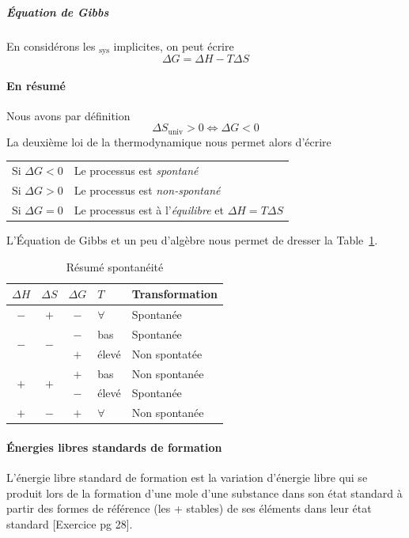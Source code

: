 \documentclass[11pt,a4paper,french]{article}
\begin{document}
\subparagraph{\'Equation de Gibbs} En considérons les $_\mathrm{sys}$ implicites, on peut écrire
$$\Delta G=\Delta H-T\Delta S$$

\paragraph{En résumé}
Nous avons par définition
\[ \Delta S_\mathrm{univ} > 0 \Leftrightarrow \Delta G < 0 \]
La deuxième loi de la thermodynamique nous permet alors d'écrire
\begin{center}
	\begin{tabular}{ll}
		Si $\Delta G < 0$ & Le processus est \emph{spontané}\\
		Si $\Delta G > 0$ & Le processus est \emph{non-spontané}\\
		Si $\Delta G = 0$ & Le processus est à l'\emph{équilibre} et $\Delta H=T\Delta S$
	\end{tabular}
\end{center}

L'\'Equation de Gibbs et un peu d'algèbre nous permet de dresser la Table~\ref{tab:hsgt}.
\begin{table}[ht!]
	\begin{center}
		\begin{tabular}{|cccll|}
			\hline
			$\Delta H$ & $\Delta S$ & $\Delta G$ & $T$ & Transformation\\
			\hline
			$-$ & $+$ & $-$ & $\forall$ & Spontanée\\
			\hline
			\multirow{2}{*}{$-$} & \multirow{2}{*}{$-$} & $-$ & bas & Spontanée\\
			& & $+$ & élevé & Non spontatée\\
			\hline
			\multirow{2}{*}{$+$} & \multirow{2}{*}{$+$} & $+$ & bas & Non spontanée\\
			& & $-$ & élevé & Spontanée\\
			\hline
			$+$ & $-$ & $+$ & $\forall$ & Non spontanée\\
			\hline
		\end{tabular}
	\end{center}
	\caption{Résumé spontanéité}
	\label{tab:hsgt}
\end{table}

\paragraph{\'Energies libres standards de formation} L'énergie libre standard de formation est la variation d'énergie libre qui se produit lors de la formation d'une mole d'une substance dans son état standard à partir des formes de référence (les + stables) de ses éléments dans leur état standard [Exercice pg 28].
\end{document}
